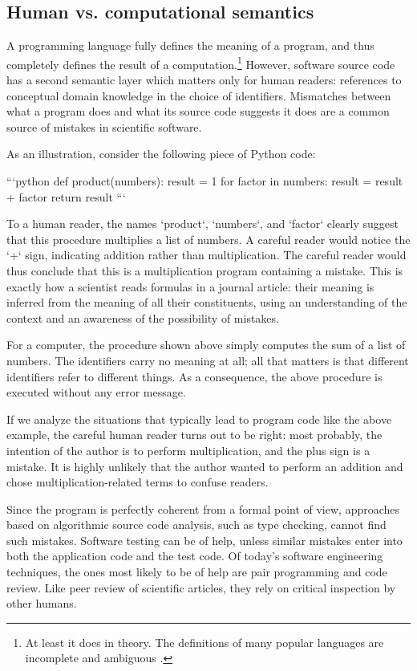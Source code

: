 \subsection{Human vs. computational semantics}
\label{HCI-semantics}

A programming language fully defines the meaning of a program, and thus completely defines the result of a computation.\footnote{At least it does in theory. The definitions of many popular languages are incomplete and ambiguous \cite{regehr_guide_2010}.} However, software source code has a second semantic layer which matters only for human readers: references to conceptual domain knowledge in the choice of identifiers. Mismatches between what a program does and what its source code suggests it does are a common source of mistakes in scientific software.

As an illustration, consider the following piece of Python code:

```python
def product(numbers):
    result = 1
    for factor in numbers:
        result = result + factor
    return result
```

To a human reader, the names `product`, `numbers`, and `factor` clearly suggest that this procedure multiplies a list of numbers. A careful reader would notice the `+` sign, indicating addition rather than multiplication. The careful reader would thus conclude that this is a multiplication program containing a mistake. This is exactly how a scientist reads formulas in a journal article: their meaning is inferred from the meaning of all their constituents, using an understanding of the context and an awareness of the possibility of mistakes.

For a computer, the procedure shown above simply computes the sum of a list of numbers. The identifiers carry no meaning at all; all that matters is that different identifiers refer to different things. As a consequence, the above procedure is executed without any error message.

If we analyze the situations that typically lead to program code like the above example, the careful human reader turns out to be right: most probably, the intention of the author is to perform multiplication, and the plus sign is a mistake. It is highly unlikely that the author wanted to perform an addition and chose multiplication-related terms to confuse readers.

Since the program is perfectly coherent from a formal point of view, approaches based on algorithmic source code analysis, such as type checking, cannot find such mistakes. Software testing can be of help, unless similar mistakes enter into both the application code and the test code. Of today's software engineering techniques, the ones most likely to be of help are pair programming and code review. Like peer review of scientific articles, they rely on critical inspection by other humans.

